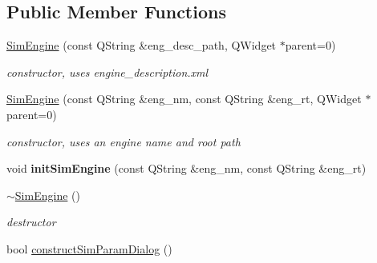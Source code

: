 \subsection*{Public Member Functions}
\begin{DoxyCompactItemize}
\item 
\hyperlink{classprim_1_1SimEngine_a8c546f2453ff9703735b99cbf029992e}{Sim\+Engine} (const Q\+String \&eng\+\_\+desc\+\_\+path, Q\+Widget $\ast$parent=0)\hypertarget{classprim_1_1SimEngine_a8c546f2453ff9703735b99cbf029992e}{}\label{classprim_1_1SimEngine_a8c546f2453ff9703735b99cbf029992e}

\begin{DoxyCompactList}\small\item\em constructor, uses engine\+\_\+description.\+xml \end{DoxyCompactList}\item 
\hyperlink{classprim_1_1SimEngine_a8a4e6dc46ca153aaedd88534aaaaa2b6}{Sim\+Engine} (const Q\+String \&eng\+\_\+nm, const Q\+String \&eng\+\_\+rt, Q\+Widget $\ast$parent=0)\hypertarget{classprim_1_1SimEngine_a8a4e6dc46ca153aaedd88534aaaaa2b6}{}\label{classprim_1_1SimEngine_a8a4e6dc46ca153aaedd88534aaaaa2b6}

\begin{DoxyCompactList}\small\item\em constructor, uses an engine name and root path \end{DoxyCompactList}\item 
void {\bfseries init\+Sim\+Engine} (const Q\+String \&eng\+\_\+nm, const Q\+String \&eng\+\_\+rt)\hypertarget{classprim_1_1SimEngine_a44ede1193cee42f5c5df272c7236181c}{}\label{classprim_1_1SimEngine_a44ede1193cee42f5c5df272c7236181c}

\item 
\hyperlink{classprim_1_1SimEngine_a6f3b160eea8b3116359267f443655525}{$\sim$\+Sim\+Engine} ()\hypertarget{classprim_1_1SimEngine_a6f3b160eea8b3116359267f443655525}{}\label{classprim_1_1SimEngine_a6f3b160eea8b3116359267f443655525}

\begin{DoxyCompactList}\small\item\em destructor \end{DoxyCompactList}\item 
bool \hyperlink{classprim_1_1SimEngine_a8adae102125794115914bda83302d39e}{construct\+Sim\+Param\+Dialog} ()\hypertarget{classprim_1_1SimEngine_a8adae102125794115914bda83302d39e}{}\label{classprim_1_1SimEngine_a8adae102125794115914bda83302d39e}


\end{DoxyCompactItemize}

